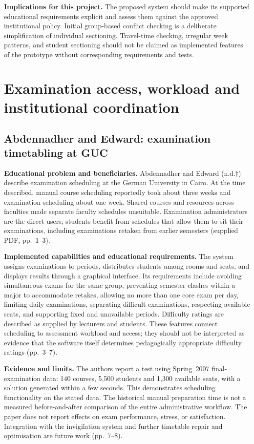 \documentclass[
  11pt,a4paper,oneside]{report}
\begin{document}
\textbf{Implications for this project.} The proposed system should make its supported educational requirements explicit and assess them against the approved institutional policy. Initial group-based conflict checking is a deliberate simplification of individual sectioning. Travel-time checking, irregular week patterns, and student sectioning should not be claimed as implemented features of the prototype without corresponding requirements and tests.

\section{Examination access, workload and institutional coordination}
\subsection{Abdennadher and Edward: examination timetabling at GUC}
\textbf{Educational problem and beneficiaries.} Abdennadher and Edward (n.d.$\dagger$) describe examination scheduling at the German University in Cairo. At the time described, manual course scheduling reportedly took about three weeks and examination scheduling about one week. Shared courses and resources across faculties made separate faculty schedules unsuitable. Examination administrators are the direct users; students benefit from schedules that allow them to sit their examinations, including examinations retaken from earlier semesters (supplied PDF, pp.~1--3).

\textbf{Implemented capabilities and educational requirements.} The system assigns examinations to periods, distributes students among rooms and seats, and displays results through a graphical interface. Its requirements include avoiding simultaneous exams for the same group, preventing semester clashes within a major to accommodate retakes, allowing no more than one core exam per day, limiting daily examinations, separating difficult examinations, respecting available seats, and supporting fixed and unavailable periods. Difficulty ratings are described as supplied by lecturers and students. These features connect scheduling to assessment workload and access; they should not be interpreted as evidence that the software itself determines pedagogically appropriate difficulty ratings (pp.~3--7).

\textbf{Evidence and limits.} The authors report a test using Spring~2007 final-examination data: 140 courses, 5,500 students and 1,300 available seats, with a solution generated within a few seconds. This demonstrates scheduling functionality on the stated data. The historical manual preparation time is not a measured before-and-after comparison of the entire administrative workflow. The paper does not report effects on exam performance, stress, or satisfaction. Integration with the invigilation system and further timetable repair and optimisation are future work (pp.~7--8).
\end{document}
